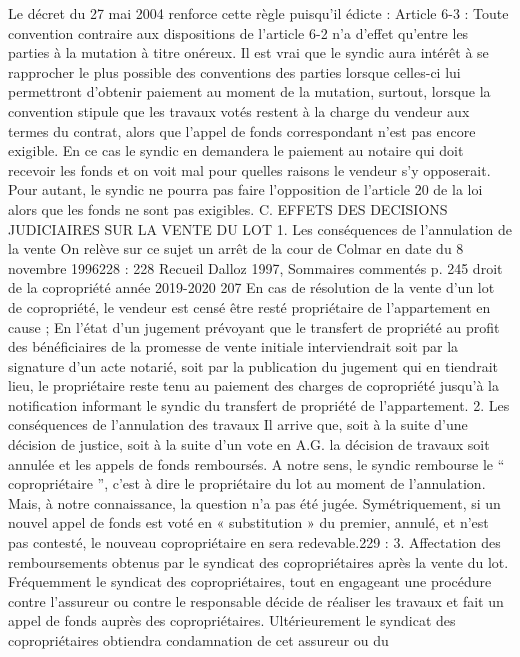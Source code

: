 	Le décret du 27 mai 2004 renforce cette règle puisqu’il édicte :
	Article 6-3 :
	Toute convention contraire aux dispositions de l'article 6-2 n'a d'effet qu'entre les parties à la mutation
	à titre onéreux.
	Il est vrai que le syndic aura intérêt à se rapprocher le plus possible des conventions des parties lorsque
	celles-ci lui permettront d’obtenir paiement au moment de la mutation, surtout, lorsque la convention
	stipule que les travaux votés restent à la charge du vendeur aux termes du contrat, alors que l’appel de
	fonds correspondant n’est pas encore exigible.
	En ce cas le syndic en demandera le paiement au notaire qui doit recevoir les fonds et on voit mal pour
	quelles raisons le vendeur s’y opposerait. Pour autant, le syndic ne pourra pas faire l’opposition de l’article
	20 de la loi alors que les fonds ne sont pas exigibles.
	C. EFFETS DES DECISIONS JUDICIAIRES SUR LA VENTE DU LOT
	1. Les conséquences de l’annulation de la vente
	On relève sur ce sujet un arrêt de la cour de Colmar en date du 8 novembre 1996228 :
	228 Recueil Dalloz 1997, Sommaires commentés p. 245
	droit de la copropriété année 2019-2020
	207
	En cas de résolution de la vente d'un lot de copropriété, le vendeur est censé être resté
	propriétaire de l'appartement en cause ;
	En l'état d'un jugement prévoyant que le transfert de propriété au profit des bénéficiaires de
	la promesse de vente initiale interviendrait soit par la signature d'un acte notarié, soit par la
	publication du jugement qui en tiendrait lieu, le propriétaire reste tenu au paiement des
	charges de copropriété jusqu'à la notification informant le syndic du transfert de propriété de
	l'appartement.
	2. Les conséquences de l’annulation des travaux
	Il arrive que, soit à la suite d’une décision de justice, soit à la suite d’un vote en A.G. la décision de travaux
	soit annulée et les appels de fonds remboursés. A notre sens, le syndic rembourse le “ copropriétaire ”,
	c’est à dire le propriétaire du lot au moment de l’annulation. Mais, à notre connaissance, la question n’a
	pas été jugée.
	Symétriquement, si un nouvel appel de fonds est voté en « substitution » du premier, annulé, et n’est pas
	contesté, le nouveau copropriétaire en sera redevable.229 :
	3. Affectation des remboursements obtenus par le syndicat des
	copropriétaires après la vente du lot.
	Fréquemment le syndicat des copropriétaires, tout en engageant une procédure contre l’assureur ou
	contre le responsable décide de réaliser les travaux et fait un appel de fonds auprès des copropriétaires.
	Ultérieurement le syndicat des copropriétaires obtiendra condamnation de cet assureur ou du

